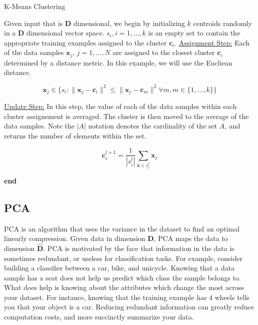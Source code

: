 \documentclass[11pt]{article}
\begin{document}
\begin{algorithm}[H]
  \caption{K-Means Clustering
    \label{alg:kmeans}}
  \begin{algorithmic}[1]
    \State Given input that is \textbf{D} dimensional, we begin by initializing $k$ centroids randomly in a \textbf{D} dimensional vector space.
    \State $s_{i},i=1,\ldots,k$ is an empty set to contain the appropriate training examples assigned to the cluster $\mathbf{c}_{i}$.
    \State \underline{Assignment Step:} Each of the data samples $\mathbf{x}_{j}$, $j=1,\ldots,N$ are assigned to the closest cluster $\mathbf{c}_{i}$ determined by a distance metric. In this example, we will use the Eucliean distance.
    
    \begin{equation}
      \mathbf{x}_{j} \in \{s_{i} : \| \mathbf{x}_{j} - \mathbf{c}_{i} \|^{2} \leq \| \mathbf{x}_{j} - \mathbf{c}_{m} \|^{2} \forall m, m \in \{1,\ldots,k\}\}
    \end{equation}

    \State \underline{Update Step:} In this step, the value of each of the data samples within each cluster assignement is averaged. The cluster is then moved to the average of the data samples. Note the $|A|$ notation denotes the cardinality of the set $A$, and returns the number of elements within the set.

    \begin{equation}
      \mathbf{c}^{t+1}_{i} = \frac{1}{|s^{t}_{i}|}\sum_{\mathbf{x} \in s^{t}_{i}} \mathbf{x}_{j}
    \end{equation}


    \EndFor
    \State \textbf{end}
  \end{algorithmic}
\end{algorithm}

\subsection{PCA}
PCA is an algorithm that uses the variance in the dataset to find an optimal linearly compression. Given data in dimension \textbf{D}, PCA maps the data to dimension $\mathbf{\hat{D}}$.
PCA is motivated by the face that information in the data is sometimes redundant, or useless for classification tasks. For example, consider building a classifier between a car, bike, and unicycle. Knowing that a data sample has a seat does not help us predict which class the sample belongs to. What does help is knowing about the attributes which change the most across your dataset. For instance, knowing that the training example has $4$ wheels tells you that your object is a car. Reducing redundant information can greatly reduce computation costs, and more succinctly summarize your data.
\end{document}
